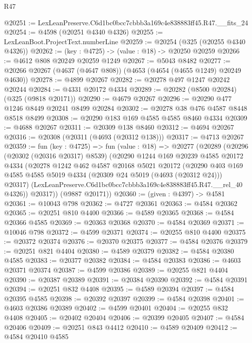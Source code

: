 \begin{lexlean}{R47}
\begin{coremodule}
@20251 := LexLeanPreserve.C6d1bc0bcc7cbbb3a169c4e838883ff45.R47.__fits_24
@20254 := @4598 (@20251 @4340 @4326)
@20255 := LexLeanBoot.ProjectText.numberLine
@20259 := @20254 (@325 (@20255 @4340 @4326))
@20262 := (key : @4725) -> (value : @18) -> @20250 @20259
@20266 := @4612 @808 @20249 @20259 @1249
@20267 := @5043 @8482
@20277 := @20266 @20267 (@4637 (@4647 @808)) (@4653 (@4654 (@4655 @1249) @20249 @4630))
@20278 := @4899 @20267
@20282 := @20278 @497 @1247 @20242 @20244
@20284 := @4331 @20172 @4334
@20289 := @20282 (@8500 @20284) (@325 (@9818 @20171))
@20290 := @4679 @20267
@20296 := @20290 @477 @1246 @8449 @20241 @8499 @20284
@20302 := @20278 @38 @476 @4587 @8448 @8518 @8499
@20308 := @20290 @183 @169 @4585 @4585 @8460 @4334
@20309 := @4688 @20267
@20311 := @20309 @138 @8460
@20312 := @4694 @20267
@20316 := @20308 (@20311 (@4693 (@20312 @138)))
@20317 := @4713 @20267
@20359 := fun (key : @4725) =>
  fun (value : @18) =>
  @20277
    (@20289
      (@20296
        (@20302 (@20316 @20317) @8539)
        (@20290
          @1244
          @169
          @20239
          @4585
          @20172
          @4334
          (@20278
            @1242
            @462
            @4587
            @20168
            @5021
            @20172
            (@20290
              @403
              @169
              @4585
              @4585
              @5019
              @4334
              (@20309 @24 @5019 (@4693 (@20312 @24)))
              @20317)
            (LexLeanPreserve.C6d1bc0bcc7cbbb3a169c4e838883ff45.R47.__rel_40 @4326))
          @20317))
      (@9887 @20171))
@20360 := (given : @4397) -> @4581
@20361 := @10043 @798
@20362 := @4727 @20361
@20363 := @4584 @20362
@20365 := @20251 @810 @4400
@20366 := @4589 @20365
@20368 := @4584 @20366 @4585
@20369 := @20363 @20368
@20370 := @4584 @20369
@20371 := @10046 @798
@20372 := @4599 @20371
@20374 := @20255 @810 @4400
@20375 := @20372 @20374
@20376 := @20370 @20375
@20377 := @4584 @20376
@20379 := @20251 @821 @4404
@20380 := @4589 @20379
@20382 := @4584 @20380 @4585
@20383 := @20377 @20382
@20384 := @4584 @20383
@20386 := @4603 @20371 @20374
@20387 := @4599 @20386
@20389 := @20255 @821 @4404
@20390 := @20387 @20389
@20391 := @20384 @20390
@20392 := @4584 @20391
@20394 := @20251 @832 @4408
@20395 := @4589 @20394
@20397 := @4584 @20395 @4585
@20398 := @20392 @20397
@20399 := @4584 @20398
@20401 := @4603 @20386 @20389
@20402 := @4599 @20401
@20404 := @20255 @832 @4408
@20405 := @20402 @20404
@20406 := @20399 @20405
@20407 := @4584 @20406
@20409 := @20251 @843 @4412
@20410 := @4589 @20409
@20412 := @4584 @20410 @4585

\end{coremodule}
\end{lexlean}
